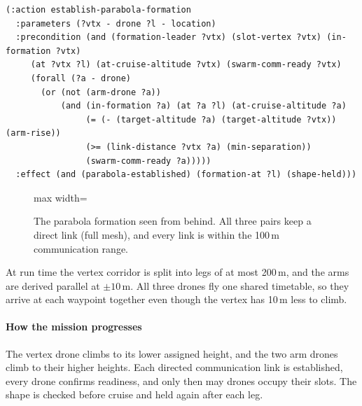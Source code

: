 \documentclass[11pt,a4paper,oneside]{report}
\begin{document}
\begin{lstlisting}
(:action establish-parabola-formation
  :parameters (?vtx - drone ?l - location)
  :precondition (and (formation-leader ?vtx) (slot-vertex ?vtx) (in-formation ?vtx)
     (at ?vtx ?l) (at-cruise-altitude ?vtx) (swarm-comm-ready ?vtx)
     (forall (?a - drone)
       (or (not (arm-drone ?a))
           (and (in-formation ?a) (at ?a ?l) (at-cruise-altitude ?a)
                (= (- (target-altitude ?a) (target-altitude ?vtx)) (arm-rise))
                (>= (link-distance ?vtx ?a) (min-separation))
                (swarm-comm-ready ?a)))))
  :effect (and (parabola-established) (formation-at ?l) (shape-held)))
\end{lstlisting}

\begin{figure}[H]
\centering
\begin{adjustbox}{max width=\linewidth}
\end{adjustbox}
\caption[Parabola formation]{The parabola formation seen from behind. All three pairs keep a direct link
(full mesh), and every link is within the 100\,m communication range.}
\label{fig:parabola}
\end{figure}

\noindent At run time the vertex corridor is split into legs of at most 200\,m, and the arms are
derived parallel at $\pm10$\,m. All three drones fly one shared timetable, so they arrive at each
waypoint together even though the vertex has 10\,m less to climb.


\paragraph{How the mission progresses}
The vertex drone climbs to its lower assigned height, and the two arm drones climb to their higher heights. Each directed communication link is established, every drone confirms readiness, and only then may drones occupy their slots. The shape is checked before cruise and held again after each leg.
\end{document}
